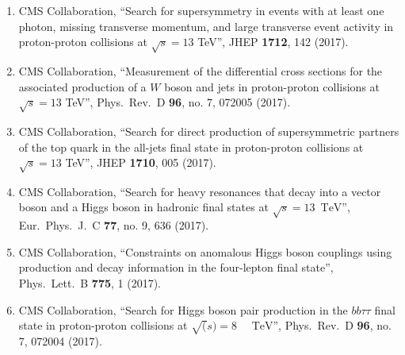 \begin{enumerate}
\item CMS Collaboration, ``Search for supersymmetry in events with at least one photon, missing transverse momentum, and large transverse event activity in proton-proton collisions at $ \sqrt{s}=13 $ TeV'', JHEP {\bf 1712}, 142 (2017).

\item CMS Collaboration, ``Measurement of the differential cross sections for the associated production of a $W$ boson and jets in proton-proton collisions at $\sqrt{s}=13$ TeV'', Phys.\ Rev.\ D {\bf 96}, no. 7, 072005 (2017).

\item CMS Collaboration, ``Search for direct production of supersymmetric partners of the top quark in the all-jets final state in proton-proton collisions at $ \sqrt{s}=13 $ TeV'', JHEP {\bf 1710}, 005 (2017).

\item CMS Collaboration, ``Search for heavy resonances that decay into a vector boson and a Higgs boson in hadronic final states at $\sqrt{s} = 13$ $\,\text {TeV}$'', Eur.\ Phys.\ J.\ C {\bf 77}, no. 9, 636 (2017).

\item CMS Collaboration, ``Constraints on anomalous Higgs boson couplings using production and decay information in the four-lepton final state'', Phys.\ Lett.\ B {\bf 775}, 1 (2017).

\item CMS Collaboration, ``Search for Higgs boson pair production in the $bb\tau\tau$ final state in proton-proton collisions at $\sqrt{(}s)=8\text{ }\text{ }\mathrm{TeV}$'', Phys.\ Rev.\ D {\bf 96}, no. 7, 072004 (2017).


\end{enumerate}

